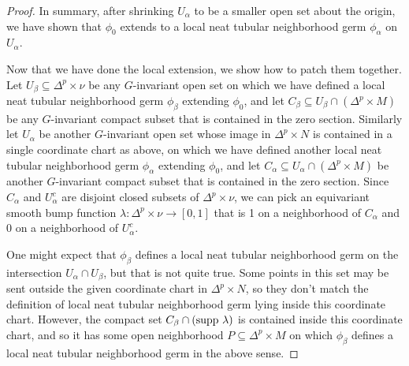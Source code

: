 \documentclass[11pt]{amsart}
\theoremstyle{definition}
\numberwithin{equation}{section}
\numberwithin{figure}{section}
\begin{document}
\begin{proof}
	In summary, after shrinking $U_\alpha$ to be a smaller open set about the origin, we have shown that $\phi_0$ extends to a local neat tubular neighborhood germ $\phi_\alpha$ on $U_\alpha$.
	
	Now that we have done the local extension, we show how to patch them together. Let $U_\beta \subseteq \Delta^p \times \nu$ be any $G$-invariant open set on which we have defined a local neat tubular neighborhood germ $\phi_\beta$ extending $\phi_0$, and let $C_\beta \subseteq U_\beta \cap (\Delta^p \times M)$ be any $G$-invariant compact subset that is contained in the zero section. Similarly let $U_\alpha$ be another $G$-invariant open set whose image in $\Delta^p \times N$ is contained in a single coordinate chart as above, on which we have defined another local neat tubular neighborhood germ $\phi_\alpha$ extending $\phi_0$, and let $C_\alpha \subseteq U_\alpha \cap (\Delta^p \times M)$ be another $G$-invariant compact subset that is contained in the zero section. Since $C_\alpha$ and $U_\alpha^c$ are disjoint closed subsets of $\Delta^p \times \nu$, we can pick an equivariant smooth bump function $\lambda\colon \Delta^p \times \nu \to [0,1]$ that is 1 on a neighborhood of $C_\alpha$ and 0 on a neighborhood of $U_\alpha^c$.
	
	One might expect that $\phi_\beta$ defines a local neat tubular neighborhood germ on the intersection $U_\alpha \cap U_\beta$, but that is not quite true. Some points in this set may be sent outside the given coordinate chart in $\Delta^p \times N$, so they don't match the definition of local neat tubular neighborhood germ lying inside this coordinate chart. However, the compact set $C_\beta \cap (\textup{supp }\lambda)$ is contained inside this coordinate chart, and so it has some open neighborhood $P \subseteq \Delta^p \times M$ on which $\phi_\beta$ defines a local neat tubular neighborhood germ in the above sense.
	

\end{proof}
\end{document}
